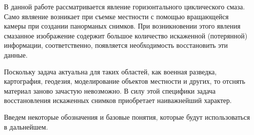\documentclass[a4paper]{article}
\theoremstyle{definition}
\begin{document}
    В данной работе рассматривается явление горизонтального циклического смаза. Само являение возникает при съемке местности с помощью вращающейся камеры при создании панорманых снимков. При возникновении этого явления смазанное изображение содержит большое количество искаженной (потерянной) информации, соответственно, появляется необходимость восстановить эти данные.


    Поскольку задача актуальна для таких областей, как военная разведка, картография, геодезия, моделирование объектов местности и других, то отснять материал заново зачастую невозможно. В силу этой специфики задача восстановления искаженных снимков приобретает наиважнейший характер.


    Введем некоторые обозначения и базовые понятия, которые будут использоваться в дальнейшем.
\vspace*{0.3cm}
\end{document}
